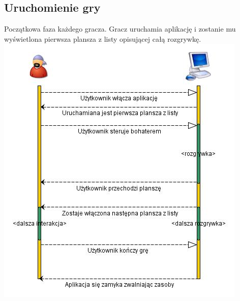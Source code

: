 \documentclass[12pt,a4paper,twoside]{article}
\begin{document}
\subsection{Uruchomienie gry}
Początkowa faza każdego gracza. Gracz uruchamia aplikację i zostanie mu wyświetlona pierwsza plansza z listy opisującej całą rozgrywkę.
\\
\includegraphics{pics/WejscieDoGry.jpg}

\end{document}
